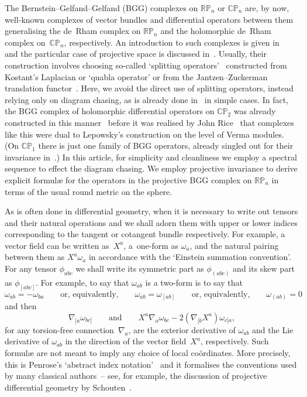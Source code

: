 \documentclass[11pt]{article}
\begin{document}
The Bernstein--Gelfand--Gelfand (BGG) complexes on ${\mathbb{RP}}_n$ or
${\mathbb{CP}}_n$ are, by now, well-known complexes of vector bundles and
dif\/ferential operators between them generalising the de~Rham complex on
${\mathbb{RP}}_n$ and the holomorphic de~Rham complex on~${\mathbb{CP}}_n$,
respectively. An introduction to such complexes is given in~\cite{eVariations}
and the particular case of projective space is discussed in~\cite{eProjective}.
Usually, their construction involves choosing so-called `splitting
operators'~\cite{cd,css4} constructed from Kostant's Laplacian \cite{k} or
`quabla operator' \cite{cd} or from the Jantzen--Zuckerman translation
functor~\cite{v}. Here, we avoid the direct use of splitting operators, instead
relying only on diagram chasing, as is already done
in~\cite{eVariations,eProjective} in simple cases. In fact, the BGG complex of
holomorphic dif\/ferential operators on ${\mathbb{CP}}_2$ was already constructed
in this manner~\cite[p.~351]{eDuality} before it was realised by John
Rice~\cite{r} that complexes like this were dual to Lepowsky's construction
\cite{l} on the level of Verma modules. (On ${\mathbb{CP}}_1$ there is just one
family of BGG operators, already singled out for their invariance
in~\cite[Proposition~2.1]{et}.) In this article, for simplicity and cleanliness
we employ a spectral sequence to ef\/fect the diagram chasing. We employ
projective invariance to derive explicit formul{\ae} for the operators in the
projective BGG complex on ${\mathbb{RP}}_n$ in terms of the usual round metric
on the sphere.

As is often done in dif\/ferential geometry, when it is necessary to write out
tensors and their natural operations and we shall adorn them with upper or
lower indices corresponding to the tangent or cotangent bundle respectively.
For example, a vector f\/ield can be written as~$X^a$, a~one-form as $\omega_a$,
and the natural pairing between them as $X^a\omega_a$ in accordance with the
`Einstein summation convention'. For any tensor $\phi_{abc}$ we shall write its
symmetric part as $\phi_{(abc)}$ and its skew part as $\phi_{[abc]}$. For
example, to say that $\omega_{ab}$ is a two-form is to say that
\[\omega_{ab}=-\omega_{ba}\qquad
\mbox{or, equivalently,}\qquad\omega_{ab}=\omega_{[ab]}\qquad
\mbox{or, equivalently,}\qquad\omega_{(ab)}=0\]
and then
\[\nabla_{[a}\omega_{bc]}\qquad\mbox{and}\qquad
X^a\nabla_a\omega_{bc}-2(\nabla_{[b}X^a)\omega_{c]a},\]
for any torsion-free connection~$\nabla_a$, are the exterior derivative of
$\omega_{ab}$ and the Lie derivative of $\omega_{ab}$ in the direction of the
vector f\/ield~$X^a$, respectively. Such formul{\ae} are not meant to imply any
choice of local co\"ordinates. More precisely, this is Penrose's `abstract
index notation'~\cite{OT} and it formalises the conventions used by many
classical authors~-- see, for example, the discussion of projective dif\/ferential
geometry by Schouten~\cite{s}.
\end{document}
